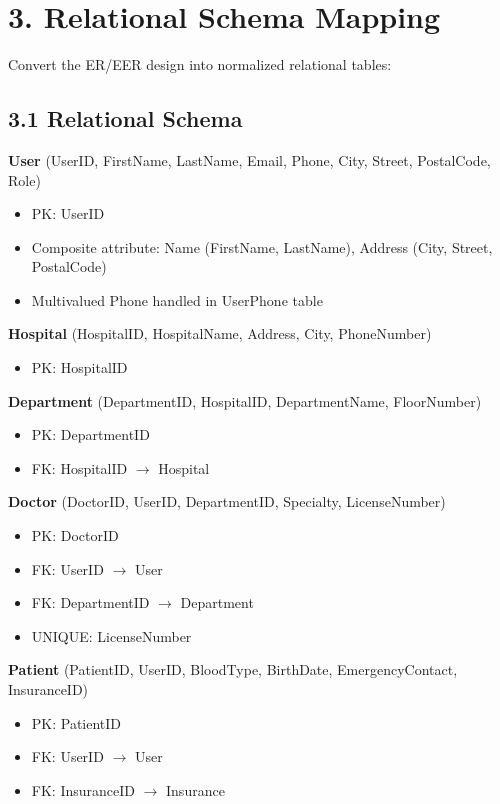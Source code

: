 \newpage
\section{3. Relational Schema Mapping}

Convert the ER/EER design into normalized relational tables:

\subsection*{3.1 Relational Schema}

\textbf{User} (UserID, FirstName, LastName, Email, Phone, City, Street, PostalCode, Role)
\begin{itemize}
    \item PK: UserID
    \item Composite attribute: Name (FirstName, LastName), Address (City, Street, PostalCode)
    \item Multivalued Phone handled in UserPhone table
\end{itemize}

\textbf{Hospital} (HospitalID, HospitalName, Address, City, PhoneNumber)
\begin{itemize}
    \item PK: HospitalID
\end{itemize}

\textbf{Department} (DepartmentID, HospitalID, DepartmentName, FloorNumber)
\begin{itemize}
    \item PK: DepartmentID
    \item FK: HospitalID $\rightarrow$ Hospital
\end{itemize}

\textbf{Doctor} (DoctorID, UserID, DepartmentID, Specialty, LicenseNumber)
\begin{itemize}
    \item PK: DoctorID
    \item FK: UserID $\rightarrow$ User
    \item FK: DepartmentID $\rightarrow$ Department
    \item UNIQUE: LicenseNumber
\end{itemize}

\textbf{Patient} (PatientID, UserID, BloodType, BirthDate, EmergencyContact, InsuranceID)
\begin{itemize}
    \item PK: PatientID
    \item FK: UserID $\rightarrow$ User
    \item FK: InsuranceID $\rightarrow$ Insurance
\end{itemize}

